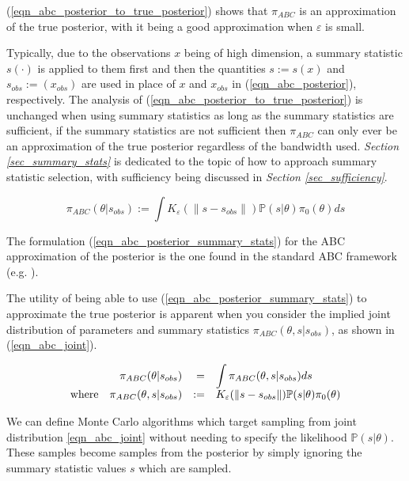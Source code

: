 \documentclass[11pt,a4paper]{article}
\newcommand*{\prob}{\mathbb{P}}
\theoremstyle{break}
\begin{document}
  \noindent (\ref{eqn_abc_posterior_to_true_posterior}) shows that $\pi_{ABC}$ is an approximation of the true posterior, with it being a good approximation when $\varepsilon$ is small.

  \par Typically, due to the observations $x$ being of high dimension, a summary statistic $s(\cdot)$ is applied to them first and then the quantities $s:=s(x)$ and $s_{obs}:=(x_{obs})$ are used in place of $x$ and $x_{obs}$ in (\ref{eqn_abc_posterior}), respectively. The analysis of (\ref{eqn_abc_posterior_to_true_posterior}) is unchanged when using summary statistics as long as the summary statistics are sufficient, if the summary statistics are not sufficient then $\pi_{ABC}$ can only ever be an approximation of the true posterior regardless of the bandwidth used. \textit{Section \ref{sec_summary_stats}} is dedicated to the topic of how to approach summary statistic selection, with sufficiency being discussed in \textit{Section \ref{sec_sufficiency}}.

  \begin{equation}\label{eqn_abc_posterior_summary_stats}
    \pi_{ABC}(\theta|s_{obs}):=\int K_\varepsilon(\|s-s_{obs}\|)\prob(s|\theta)\pi_0(\theta)ds
  \end{equation}

  The formulation (\ref{eqn_abc_posterior_summary_stats}) for the ABC approximation of the posterior is the one found in the standard ABC framework (e.g. \cite[]{overview_of_abc,annual_review_of_statistics_ABC}).

  \par The utility of being able to use (\ref{eqn_abc_posterior_summary_stats}) to approximate the true posterior is apparent when you consider the implied joint distribution of parameters and summary statistics $\pi_{ABC}(\theta,s|s_{obs})$, as shown in (\ref{eqn_abc_joint}).

  \begin{equation}\label{eqn_abc_joint}
    \everymath={\displaystyle}\begin{array}{rrrl}
      &\pi_{ABC}(\theta|s_{obs})&=&\int \pi_{ABC}(\theta,s|s_{obs})ds\\
      \text{where}&\pi_{ABC}(\theta,s|s_{obs})&:=&K_\varepsilon(\|s-s_{obs}\|)\prob(s|\theta)\pi_0(\theta)
    \end{array}
  \end{equation}

  We can define Monte Carlo algorithms which target sampling from joint distribution \ref{eqn_abc_joint} without needing to specify the likelihood $\prob(s|\theta)$. These samples become samples from the posterior by simply ignoring the summary statistic values $s$ which are sampled.
\end{document}
